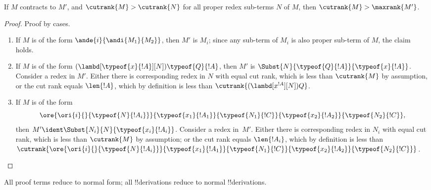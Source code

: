 \documentclass[../../../include/open-logic-section]{subfiles}
\begin{document}
\begin{lem}
  If $M$ contracts to $M'$, and $\cutrank{M} > \cutrank{N}$ for all
  proper redex sub-terms $N$ of $M$, then $\cutrank{M} >
  \maxrank{M'}$.
\end{lem}

\begin{proof}
  Proof by cases.
  \begin{enumerate}
  \item If $M$ is of the form $\ande{i}{\andi{M_1}{M_2}}$, then $M'$ is
    $M_i$; since any sub-term of $M_i$ is also proper
    sub-term of $M$, the claim holds.
  \item If $M$ is of the form
    $(\lambd[\typeof{x}{!A}][N])\typeof{Q}{!A}$, then $M'$ is
    $\Subst{N}{\typeof{Q}{!A}}{\typeof{x}{!A}}$.  Consider a redex in
    $M'$.  Either there is corresponding redex in $N$ with equal cut
    rank, which is less than $\cutrank{M}$ by assumption, or the cut
    rank equals $\len{!A}$, which by definition is less than
    $\cutrank{(\lambd[x^{!A}][N])Q}$.
  \item If $M$ is of the form
    \[
    \ore{\ori{i}{}{\typeof{N}{!A_i}}}
        {\typeof{x_1}{!A_1}}{\typeof{N_1}{!C}}
        {\typeof{x_2}{!A_2}}{\typeof{N_2}{!C}},
    \]
    then $M' \ident \Subst{N_i}{N}{\typeof{x_i}{!A_i}}$.  Consider a
    redex in~$M'$. Either there is corresponding redex in $N_i$ with
    equal cut rank, which is less than $\cutrank{M}$ by assumption; or
    the cut rank equals $\len{!A_i}$, which by definition is less than
    $\cutrank{\ore{\ori{i}{}{\typeof{N}{!A_i}}}
      {\typeof{x_1}{!A_1}}{\typeof{N_1}{!C}}
      {\typeof{x_2}{!A_2}}{\typeof{N_2}{!C}}}$.
  \end{enumerate}
\end{proof}

\begin{thm}
  All proof terms reduce to normal form; all !!{derivation}s reduce to
  normal !!{derivation}s.
\end{thm}
\end{document}
